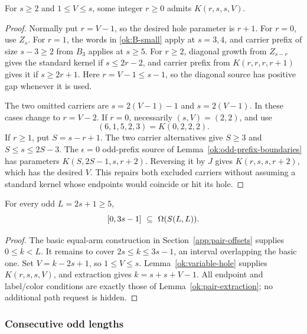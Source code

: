 \begin{lemma}\label{ok:variable-hole}
For $s\ge2$ and $1\le V\le s$, some integer $r\ge0$ admits
$K(r,s,s,V)$.
\end{lemma}
\begin{proof}
Normally put $r=V-1$, so the desired hole parameter is $r+1$.
For $r=0$, use $Z_s$. For $r=1$, the words in
\eqref{ok:B-small} apply at $s=3,4$, and carrier prefix of
size $s-3\ge2$ from $B_3$ applies at $s\ge5$.
For $r\ge2$, diagonal growth from $Z_{s-r}$ gives the standard
kernel if $s\le2r-2$, and carrier prefix from
$K(r,r,r,r+1)$ gives it if $s\ge2r+1$.
Here $r=V-1\le s-1$, so the diagonal source has positive gap
whenever it is used.

The two omitted carriers are $s=2(V-1)-1$ and $s=2(V-1)$.
In these cases change to $r=V-2$.
If $r=0$, necessarily $(s,V)=(2,2)$, and use
\[
 (6,1,5,2,3)=K(0,2,2,2).
 \]
If $r\ge1$, put $S=s-r+1$.
The two carrier alternatives give $S\ge3$ and
$S\le s\le2S-3$.
The $\epsilon=0$ odd-prefix source
of Lemma~\ref{ok:odd-prefix-boundaries} has parameters
$K(S,2S-1,s,r+2)$.
Reversing it by $J$ gives $K(r,s,s,r+2)$,
which has the desired $V$.
This repairs both excluded carriers without assuming a standard
kernel whose endpoints would coincide or hit its hole.
\end{proof}

\begin{proposition}\label{ok:equal-odd-offsets}
For every odd $L=2s+1\ge5$,
\[
 [0,3s-1]\ \subseteq\ \Om(\Sp{L,L}).
 \]
\end{proposition}
\begin{proof}
The basic equal-arm construction in Section~\ref{app:pair-offsets}
supplies $0\le k<L$. It remains to cover
$2s\le k\le3s-1$, an interval overlapping the basic one.
Set $V=k-2s+1$, so $1\le V\le s$.
Lemma~\ref{ok:variable-hole} supplies $K(r,s,s,V)$,
and extraction gives $k=s+s+V-1$.
All endpoint and label/color conditions are exactly those of
Lemma~\ref{ok:pair-extraction}; no additional path request is hidden.
\end{proof}

\subsubsection{Consecutive odd lengths}

